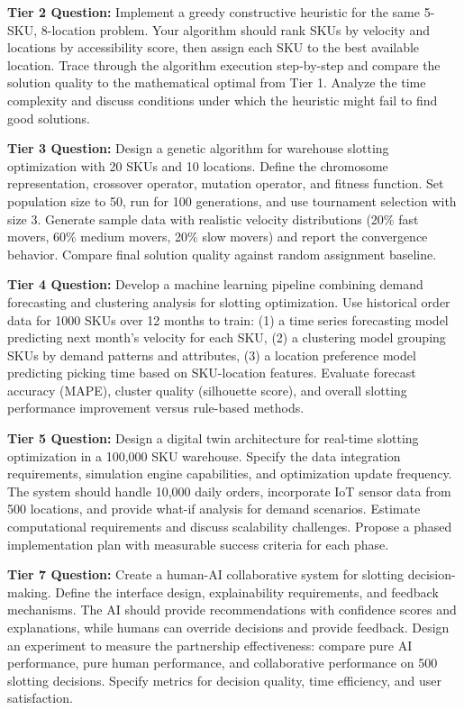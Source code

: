 \documentclass{article}
\begin{document}
\textbf{Tier 2 Question:} Implement a greedy constructive heuristic for the same 5-SKU, 8-location problem. Your algorithm should rank SKUs by velocity and locations by accessibility score, then assign each SKU to the best available location. Trace through the algorithm execution step-by-step and compare the solution quality to the mathematical optimal from Tier 1. Analyze the time complexity and discuss conditions under which the heuristic might fail to find good solutions.

\textbf{Tier 3 Question:} Design a genetic algorithm for warehouse slotting optimization with 20 SKUs and 10 locations. Define the chromosome representation, crossover operator, mutation operator, and fitness function. Set population size to 50, run for 100 generations, and use tournament selection with size 3. Generate sample data with realistic velocity distributions (20\% fast movers, 60\% medium movers, 20\% slow movers) and report the convergence behavior. Compare final solution quality against random assignment baseline.

\textbf{Tier 4 Question:} Develop a machine learning pipeline combining demand forecasting and clustering analysis for slotting optimization. Use historical order data for 1000 SKUs over 12 months to train: (1) a time series forecasting model predicting next month's velocity for each SKU, (2) a clustering model grouping SKUs by demand patterns and attributes, (3) a location preference model predicting picking time based on SKU-location features. Evaluate forecast accuracy (MAPE), cluster quality (silhouette score), and overall slotting performance improvement versus rule-based methods.

\textbf{Tier 5 Question:} Design a digital twin architecture for real-time slotting optimization in a 100,000 SKU warehouse. Specify the data integration requirements, simulation engine capabilities, and optimization update frequency. The system should handle 10,000 daily orders, incorporate IoT sensor data from 500 locations, and provide what-if analysis for demand scenarios. Estimate computational requirements and discuss scalability challenges. Propose a phased implementation plan with measurable success criteria for each phase.

\textbf{Tier 7 Question:} Create a human-AI collaborative system for slotting decision-making. Define the interface design, explainability requirements, and feedback mechanisms. The AI should provide recommendations with confidence scores and explanations, while humans can override decisions and provide feedback. Design an experiment to measure the partnership effectiveness: compare pure AI performance, pure human performance, and collaborative performance on 500 slotting decisions. Specify metrics for decision quality, time efficiency, and user satisfaction.
\end{document}
